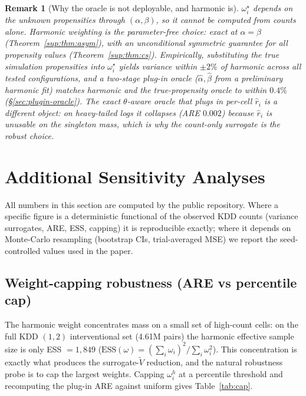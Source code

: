 \documentclass[11pt]{article}
\newtheorem{remark}{Remark}
\begin{document}
\begin{remark}[Why the oracle is not deployable, and harmonic is]
$\omega_i^\star$ depends on the unknown propensities through
$(\alpha,\beta)$, so it cannot be computed from counts alone. Harmonic
weighting is the parameter-free choice: exact at $\alpha=\beta$
(Theorem~\ref{sup:thm:asym}), with an unconditional symmetric guarantee
for all propensity values (Theorem~\ref{sup:thm:cs}). Empirically,
substituting the true simulation propensities into $\omega_i^\star$
yields variance within $\pm2\%$ of harmonic across all tested
configurations, and a two-stage plug-in oracle
($\hat\alpha,\hat\beta$ from a preliminary harmonic fit) matches
harmonic and the true-propensity oracle to within $0.4\%$
(\S\ref{sec:plugin-oracle}). The exact $\theta$-aware oracle that plugs
in per-cell $\hat r_i$ is a different object: on heavy-tailed logs it
collapses (ARE $0.002$) because $\hat r_i$ is unusable on the
singleton mass, which is why the count-only surrogate is the robust
choice.
\end{remark}

\section{Additional Sensitivity Analyses}
\label{sec:sensitivity}

All numbers in this section are computed by the public repository. Where
a specific figure is a deterministic functional of the observed KDD
counts (variance surrogates, ARE, ESS, capping) it is reproducible
exactly; where it depends on Monte-Carlo resampling (bootstrap CIs,
trial-averaged MSE) we report the seed-controlled values used in the
paper.

\subsection{Weight-capping robustness (ARE vs percentile cap)}
\label{sec:capping}

The harmonic weight concentrates mass on a small set of high-count
cells: on the full KDD $(1,2)$ interventional set (4.61M pairs) the
harmonic effective sample size is only ESS $=1{,}849$
($\mathrm{ESS}(\omega)=(\sum_i\omega_i)^2/\sum_i\omega_i^2$). This
concentration is exactly what produces the surrogate-$\widetilde V$
reduction, and the natural robustness probe is to cap the largest
weights. Capping $\omega_i^h$ at a percentile threshold and recomputing
the plug-in ARE against uniform gives Table~\ref{tab:cap}.
\end{document}
